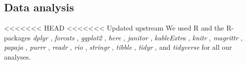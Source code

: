 \documentclass[
  english,
  man]{apa6}
\begin{document}
\hypertarget{data-analysis}{%
\subsection{Data analysis}\label{data-analysis}}

<<<<<<< HEAD
<<<<<<< Updated upstream
We used R \autocite[Version 3.6.1;][]{R-base} and the R-packages \emph{dplyr} \autocite[Version 1.0.0;][]{R-dplyr}, \emph{forcats} \autocite[Version 0.5.0;][]{R-forcats}, \emph{ggplot2} \autocite[Version 3.3.2;][]{R-ggplot2}, \emph{here} \autocite[Version 0.1;][]{R-here}, \emph{janitor} \autocite[Version 2.0.1;][]{R-janitor}, \emph{kableExtra} \autocite[Version 1.3.1;][]{R-kableExtra}, \emph{knitr} \autocite[Version 1.29;][]{R-knitr}, \emph{magrittr} \autocite[Version 1.5;][]{R-magrittr}, \emph{papaja} \autocite[Version 0.1.0.9997;][]{R-papaja}, \emph{purrr} \autocite[Version 0.3.4;][]{R-purrr}, \emph{readr} \autocite[Version 1.3.1;][]{R-readr}, \emph{rio} \autocite[Version 0.5.16;][]{R-rio}, \emph{stringr} \autocite[Version 1.4.0;][]{R-stringr}, \emph{tibble} \autocite[Version 3.0.2;][]{R-tibble}, \emph{tidyr} \autocite[Version 1.1.0;][]{R-tidyr}, and \emph{tidyverse} \autocite[Version 1.3.0;][]{R-tidyverse} for all our analyses.
\end{document}
